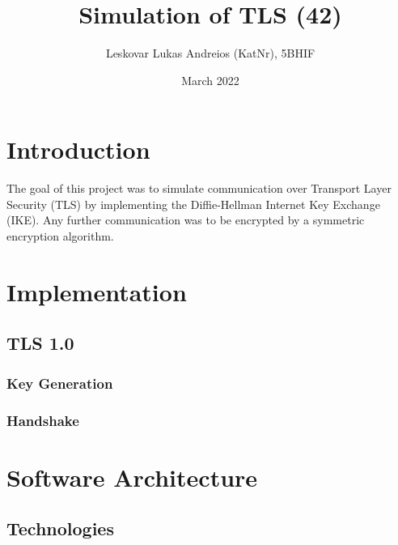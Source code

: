 \documentclass[12pt, letterpaper]{article}
\title{Simulation of TLS (42)}
\author{Leskovar Lukas Andreios (KatNr), 5BHIF}
\date{March 2022}
\begin{document}
\begin{titlepage}
\maketitle
\end{titlepage}

\tableofcontents
\newpage

\section{Introduction}
The goal of this project was to simulate communication over Transport Layer Security (TLS) by implementing the Diffie-Hellman Internet Key Exchange (IKE). Any further communication was to be encrypted by a symmetric encryption algorithm.

\section{Implementation}


\subsection{TLS 1.0}


\subsubsection{Key Generation}


\subsubsection{Handshake}


\section{Software Architecture}

\subsection{Technologies}
\end{document}
